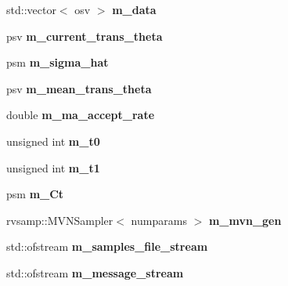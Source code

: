 \begin{DoxyCompactItemize}
\item 
\mbox{\label{classada__pmmh_a4eae8f5350ee02b3041a56b8477b7cc9}} 
std\+::vector$<$ osv $>$ {\bfseries m\+\_\+data}
\item 
\mbox{\label{classada__pmmh_ab95501d2b47c94e405959545094b33c4}} 
psv {\bfseries m\+\_\+current\+\_\+trans\+\_\+theta}
\item 
\mbox{\label{classada__pmmh_a4397034d42abf48d85c37573ad4b137a}} 
psm {\bfseries m\+\_\+sigma\+\_\+hat}
\item 
\mbox{\label{classada__pmmh_af92a45bb0f1c09695f9bdfe70da91268}} 
psv {\bfseries m\+\_\+mean\+\_\+trans\+\_\+theta}
\item 
\mbox{\label{classada__pmmh_a7257a454e068ef74880f166b0d1e73d5}} 
double {\bfseries m\+\_\+ma\+\_\+accept\+\_\+rate}
\item 
\mbox{\label{classada__pmmh_a70197ecca3a74968e814a45261052b72}} 
unsigned int {\bfseries m\+\_\+t0}
\item 
\mbox{\label{classada__pmmh_a4e2f07d2dfc87db3db46dda6f3e0b3e1}} 
unsigned int {\bfseries m\+\_\+t1}
\item 
\mbox{\label{classada__pmmh_a75a274ef04d45f7f6bb3c444bf063c2c}} 
psm {\bfseries m\+\_\+\+Ct}
\item 
\mbox{\label{classada__pmmh_ad1f3dabd5006b89a899c8ae2daad169f}} 
rvsamp\+::\+M\+V\+N\+Sampler$<$ numparams $>$ {\bfseries m\+\_\+mvn\+\_\+gen}
\item 
\mbox{\label{classada__pmmh_a16e7aea5b2b3d77514e62c878cd3a906}} 
std\+::ofstream {\bfseries m\+\_\+samples\+\_\+file\+\_\+stream}
\item 
\mbox{\label{classada__pmmh_a925dfc2e2fcd61bd37db705f5c894a1b}} 
std\+::ofstream {\bfseries m\+\_\+message\+\_\+stream}
\item 
\mbox{\label{classada__pmmh_a8207d3f7daf94a467ae33c9261256379}} 

\end{DoxyCompactItemize}
